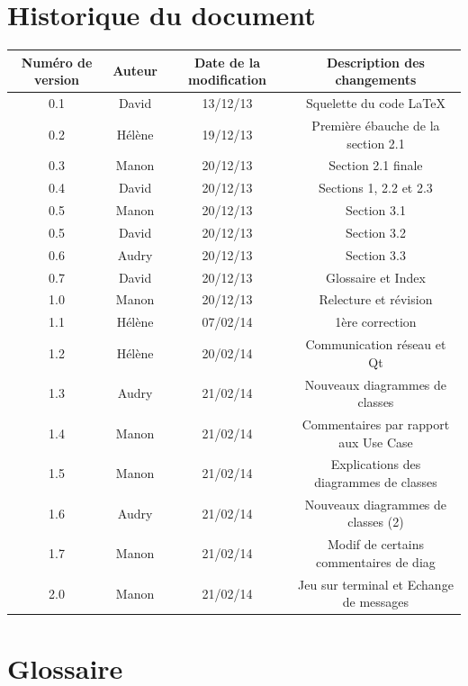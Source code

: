 \documentclass[a4paper,titlepage]{scrreprt}
\begin{document}
\section{Historique du document}
  \begin{tabular}{|c|c|c|c|}
    \hline
    Numéro de version & Auteur & Date de la modification & Description des changements \\
    \hline
    0.1 & David & 13/12/13 & Squelette du code \LaTeX \\
    0.2 & Hélène & 19/12/13 & Première ébauche de la section 2.1 \\
    0.3 & Manon & 20/12/13 & Section 2.1 finale \\
    0.4 & David & 20/12/13 & Sections 1,  2.2 et 2.3 \\
    0.5 & Manon & 20/12/13 & Section 3.1 \\
    0.5 & David & 20/12/13 & Section 3.2 \\
    0.6 & Audry & 20/12/13 & Section 3.3 \\
    0.7 & David & 20/12/13 & Glossaire et Index \\
    1.0 & Manon & 20/12/13 & Relecture et révision \\
    1.1 & Hélène & 07/02/14 & 1ère correction \\
    1.2 & Hélène & 20/02/14 & Communication réseau et Qt \\    
    1.3 & Audry & 21/02/14 & Nouveaux diagrammes de classes \\
    1.4 & Manon & 21/02/14 & Commentaires par rapport aux Use Case \\
    1.5 & Manon & 21/02/14 & Explications des diagrammes de classes \\
    1.6 & Audry & 21/02/14 & Nouveaux diagrammes de classes (2) \\
    1.7 & Manon & 21/02/14 & Modif de certains commentaires de diag \\
    2.0 & Manon & 21/02/14 & Jeu sur terminal et Echange de messages \\
    \hline
  \end{tabular}


\section{Glossaire}
  \removepagebreak
  \printglossaries
  \restorepagebreak
\end{document}

